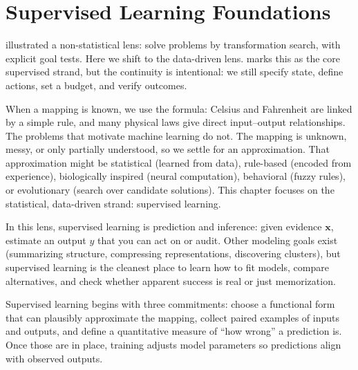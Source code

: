 \section{Supervised Learning Foundations}\label{chap:supervised}

 illustrated a non-statistical lens: solve problems by transformation search, with explicit goal tests. Here we shift to the data-driven lens.  marks this as the core supervised strand, but the continuity is intentional: we still specify state, define actions, set a budget, and verify outcomes.

When a mapping is known, we use the formula: Celsius and Fahrenheit are linked by a simple rule, and many physical laws give direct input--output relationships. The problems that motivate machine learning do not. The mapping is unknown, messy, or only partially understood, so we settle for an approximation. That approximation might be statistical (learned from data), rule-based (encoded from experience), biologically inspired (neural computation), behavioral (fuzzy rules), or evolutionary (search over candidate solutions). This chapter focuses on the statistical, data-driven strand: supervised learning.

In this lens, supervised learning is prediction and inference: given evidence \(\mathbf{x}\), estimate an output \(y\) that you can act on or audit. Other modeling goals exist (summarizing structure, compressing representations, discovering clusters), but supervised learning is the cleanest place to learn how to fit models, compare alternatives, and check whether apparent success is real or just memorization.

Supervised learning begins with three commitments: choose a functional form that can plausibly approximate the mapping, collect paired examples of inputs and outputs, and define a quantitative measure of ``how wrong'' a prediction is. Once those are in place, training adjusts model parameters so predictions align with observed outputs.

